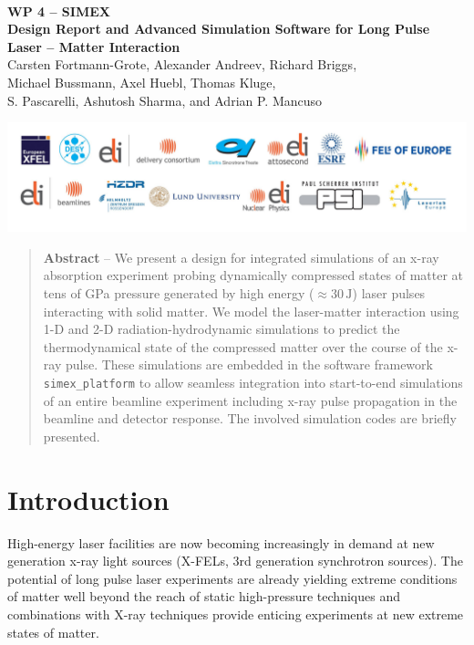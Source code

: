 \documentclass[12pt]{scrartcl}
\begin{document}
\makeatletter
\begin{titlepage}
\thispagestyle{scrheadings}
\begin{center}
$~$\\
\vspace{2cm}
\Huge{\textbf{WP 4 -- SIMEX\\[1cm]
Design Report and Advanced Simulation Software for Long Pulse Laser -- Matter Interaction}}\\[5mm]
\vspace{2cm}
\large{
Carsten Fortmann-Grote, Alexander Andreev, Richard Briggs,\\ Michael Bussmann,
  Axel Huebl, Thomas Kluge,\\
 S. Pascarelli, Ashutosh Sharma, and Adrian P. Mancuso\\
 }
\vspace{1cm}
\@date
\end{center}
\vfill%
\includegraphics[width=\textwidth]{./PartnerLogos.pdf}
\normalfont
\end{titlepage}
\makeatother

\tableofcontents

\begin{abstract}
  \noindent%
  \textbf{Abstract} -- We present a design for integrated simulations of an x-ray absorption
  experiment probing dynamically compressed states of matter at tens of GPa pressure generated by
  high energy ($\approx 30\,\text{J}$) laser pulses interacting with solid matter.
  We model the laser-matter interaction using 1-D and 2-D radiation-hydrodynamic simulations to predict
  the thermodynamical state of the compressed matter over the course of the x-ray pulse. These simulations
  are embedded in the software framework \texttt{simex\_platform} to allow seamless integration into
  start-to-end simulations of an entire beamline experiment including x-ray pulse propagation in the beamline and
  detector response. The involved simulation codes are briefly presented.
\end{abstract}
%
\section{Introduction}
High-energy laser facilities are now becoming increasingly in demand at new
generation x-ray light sources (X-FELs, 3rd generation synchrotron sources). The
potential of long pulse laser experiments are already yielding extreme
conditions of matter well beyond the reach of static high-pressure techniques
and combinations with X-ray techniques provide enticing experiments at new
extreme states of matter.
\end{document}
